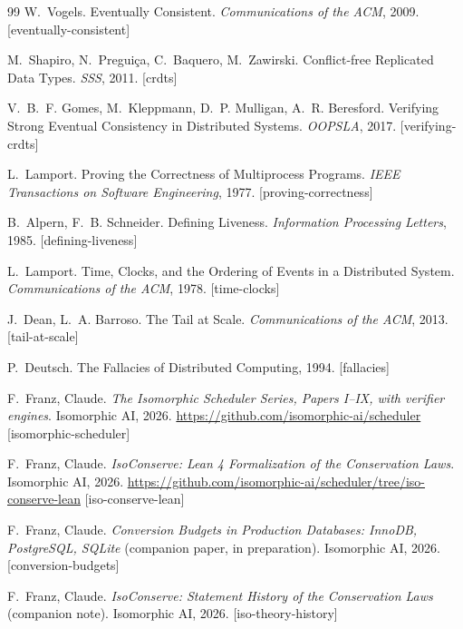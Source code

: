 \documentclass[11pt]{article}
\begin{document}
\begin{thebibliography}{99}
 W.~Vogels. Eventually Consistent.
\emph{Communications of the ACM}, 2009. [eventually-consistent]

 M.~Shapiro, N.~Pregui\c{c}a, C.~Baquero, M.~Zawirski.
Conflict-free Replicated Data Types. \emph{SSS}, 2011. [crdts]

 V.~B.~F. Gomes, M.~Kleppmann, D.~P. Mulligan,
A.~R. Beresford. Verifying Strong Eventual Consistency in Distributed
Systems. \emph{OOPSLA}, 2017. [verifying-crdts]

 L.~Lamport. Proving the Correctness of
Multiprocess Programs. \emph{IEEE Transactions on Software
Engineering}, 1977. [proving-correctness]

 B.~Alpern, F.~B. Schneider. Defining
Liveness. \emph{Information Processing Letters}, 1985.
[defining-liveness]

 L.~Lamport. Time, Clocks, and the Ordering of
Events in a Distributed System. \emph{Communications of the ACM},
1978. [time-clocks]

 J.~Dean, L.~A. Barroso. The Tail at Scale.
\emph{Communications of the ACM}, 2013. [tail-at-scale]

 P.~Deutsch. The Fallacies of Distributed Computing,
1994. [fallacies]

 F.~Franz, Claude. \emph{The Isomorphic
Scheduler Series, Papers I--IX, with verifier engines}. Isomorphic AI,
2026. \url{https://github.com/isomorphic-ai/scheduler}
[isomorphic-scheduler]

 F.~Franz, Claude. \emph{IsoConserve: Lean 4
Formalization of the Conservation Laws}. Isomorphic AI, 2026.
\url{https://github.com/isomorphic-ai/scheduler/tree/iso-conserve-lean}
[iso-conserve-lean]

 F.~Franz, Claude. \emph{Conversion
Budgets in Production Databases: InnoDB, PostgreSQL, SQLite}
(companion paper, in preparation). Isomorphic AI, 2026.
[conversion-budgets]

 F.~Franz, Claude. \emph{IsoConserve:
Statement History of the Conservation Laws} (companion note).
Isomorphic AI, 2026. [iso-theory-history]

\end{thebibliography}

\appendix
\end{document}
